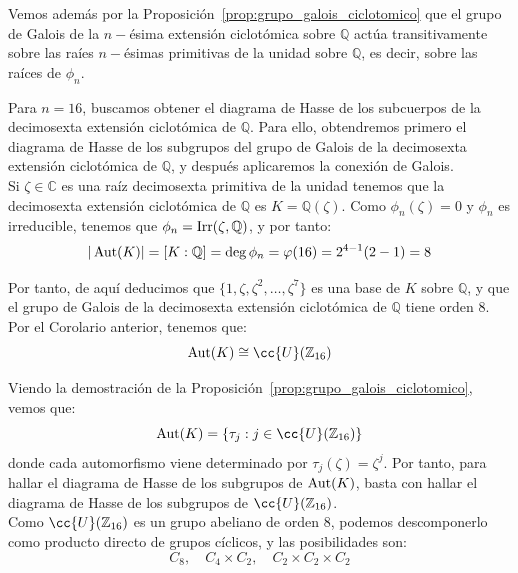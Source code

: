 \noindent
Vemos además por la Proposición~\ref{prop:grupo_galois_ciclotomico} que el grupo de Galois de la $n-$ésima extensión ciclotómica sobre $\mathbb{Q}$ actúa transitivamente sobre las raíes $n-$ésimas primitivas de la unidad sobre $\mathbb{Q}$, es decir, sobre las raíces de $\phi_n$.

\begin{ejemplo}
    Para $n=16$, buscamos obtener el diagrama de Hasse de los subcuerpos de la decimosexta extensión ciclotómica de $\mathbb{Q}$. Para ello, obtendremos primero el diagrama de Hasse de los subgrupos del grupo de Galois de la decimosexta extensión ciclotómica de $\mathbb{Q}$, y después aplicaremos la conexión de Galois.\\

    Si $\zeta\in \mathbb{C}$ es una raíz decimosexta primitiva de la unidad tenemos que la decimosexta extensión ciclotómica de $\mathbb{Q}$ es $K=\mathbb{Q}(\zeta)$. Como $\phi_n(\zeta) = 0$ y $\phi_n$ es irreducible, tenemos que $\phi_n = \operatorname{Irr}(\zeta,\mathbb{Q})$, y por tanto:
    \begin{equation*}
        |\operatorname{Aut}(K)| = [K:\mathbb{Q}] = \deg \phi_n = \varphi(16) = 2^{4-1}(2-1) = 8
    \end{equation*}

    Por tanto, de aquí deducimos que $\{1, \zeta, \zeta^2, \ldots, \zeta^7\}$ es una base de $K$ sobre $\mathbb{Q}$, y que el grupo de Galois de la decimosexta extensión ciclotómica de $\mathbb{Q}$ tiene orden $8$.\\
    
    Por el Corolario anterior, tenemos que:
    \begin{equation*}
        \Aut(K) \cong \cc{U}(\mathbb{Z}_{16})
    \end{equation*}

    Viendo la demostración de la Proposición~\ref{prop:grupo_galois_ciclotomico}, vemos que:
    \begin{equation*}
        \Aut(K) = \{\tau_j: j \in \cc{U}(\mathbb{Z}_{16})\}
    \end{equation*}
    donde cada automorfismo viene determinado por $\tau_j(\zeta) = \zeta^j$. Por tanto, para hallar el diagrama de Hasse de los subgrupos de $\operatorname{Aut}(K)$, basta con hallar el diagrama de Hasse de los subgrupos de $\cc{U}(\mathbb{Z}_{16})$.\\

    Como $\cc{U}(\mathbb{Z}_{16})$ es un grupo abeliano de orden $8$, podemos descomponerlo como producto directo de grupos cíclicos, y las posibilidades son:
    \begin{equation*}
        C_8, \quad C_4\times C_2, \quad C_2\times C_2\times C_2
    \end{equation*}


\end{ejemplo}
